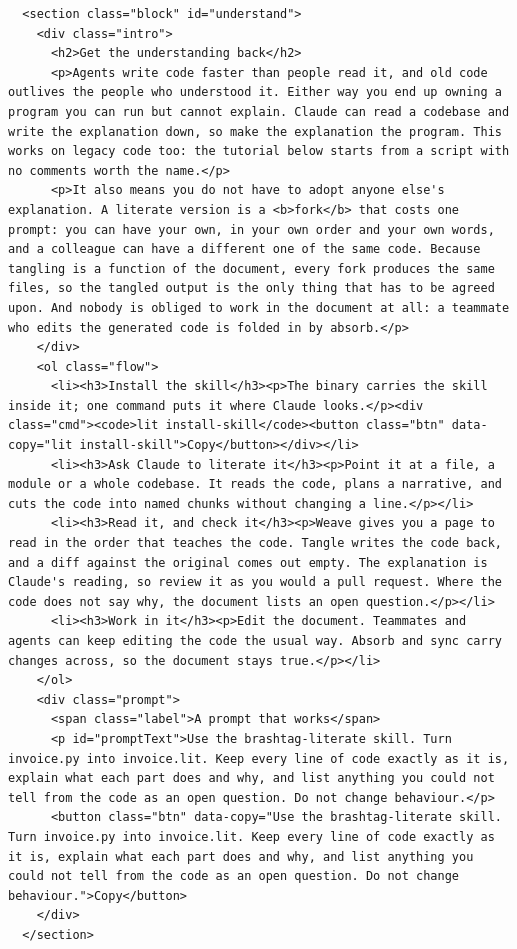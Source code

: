\documentclass[10pt,a4paper]{article}
\newcounter{chunk}
\begin{document}
\begin{Verbatim}
  <section class="block" id="understand">
    <div class="intro">
      <h2>Get the understanding back</h2>
      <p>Agents write code faster than people read it, and old code outlives the people who understood it. Either way you end up owning a program you can run but cannot explain. Claude can read a codebase and write the explanation down, so make the explanation the program. This works on legacy code too: the tutorial below starts from a script with no comments worth the name.</p>
      <p>It also means you do not have to adopt anyone else's explanation. A literate version is a <b>fork</b> that costs one prompt: you can have your own, in your own order and your own words, and a colleague can have a different one of the same code. Because tangling is a function of the document, every fork produces the same files, so the tangled output is the only thing that has to be agreed upon. And nobody is obliged to work in the document at all: a teammate who edits the generated code is folded in by absorb.</p>
    </div>
    <ol class="flow">
      <li><h3>Install the skill</h3><p>The binary carries the skill inside it; one command puts it where Claude looks.</p><div class="cmd"><code>lit install-skill</code><button class="btn" data-copy="lit install-skill">Copy</button></div></li>
      <li><h3>Ask Claude to literate it</h3><p>Point it at a file, a module or a whole codebase. It reads the code, plans a narrative, and cuts the code into named chunks without changing a line.</p></li>
      <li><h3>Read it, and check it</h3><p>Weave gives you a page to read in the order that teaches the code. Tangle writes the code back, and a diff against the original comes out empty. The explanation is Claude's reading, so review it as you would a pull request. Where the code does not say why, the document lists an open question.</p></li>
      <li><h3>Work in it</h3><p>Edit the document. Teammates and agents can keep editing the code the usual way. Absorb and sync carry changes across, so the document stays true.</p></li>
    </ol>
    <div class="prompt">
      <span class="label">A prompt that works</span>
      <p id="promptText">Use the brashtag-literate skill. Turn invoice.py into invoice.lit. Keep every line of code exactly as it is, explain what each part does and why, and list anything you could not tell from the code as an open question. Do not change behaviour.</p>
      <button class="btn" data-copy="Use the brashtag-literate skill. Turn invoice.py into invoice.lit. Keep every line of code exactly as it is, explain what each part does and why, and list anything you could not tell from the code as an open question. Do not change behaviour.">Copy</button>
    </div>
  </section>


\end{Verbatim}
\end{document}
